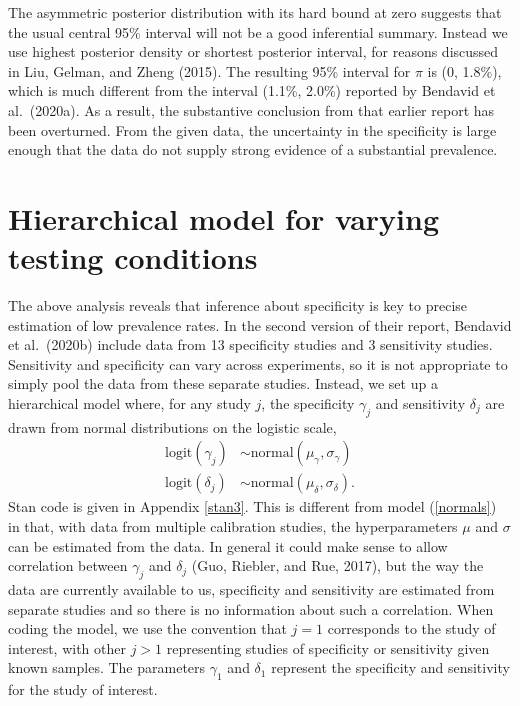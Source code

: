 \documentclass[11pt]{article}
\begin{document}
The asymmetric posterior distribution with its hard bound at zero suggests that the usual central 95\% interval will not be a good inferential summary.  Instead we use highest posterior density or shortest posterior interval, for reasons discussed in Liu, Gelman, and Zheng (2015). The resulting 95\% interval for $\pi$ is (0, 1.8\%), which is much different from the interval (1.1\%, 2.0\%) reported by Bendavid et al.\ (2020a).  As a result, the substantive conclusion from that earlier report has been overturned. From the given data, the uncertainty in the specificity is large enough that the data do not supply strong evidence of a substantial prevalence.

\section{Hierarchical model for varying testing conditions}\label{model2}
The above analysis reveals that inference about specificity is key to precise estimation of low prevalence rates.  In the second version of their report, Bendavid et al.\ (2020b) include data from 13 specificity studies and 3 sensitivity studies.  Sensitivity and specificity can vary across experiments, so it is not appropriate to simply pool the data from these separate studies.  Instead, we set up a hierarchical model where, for any study $j$, the specificity $\gamma_j$ and sensitivity $\delta_j$ are drawn from normal distributions on the logistic scale,
\begin{align*}
  \mbox{logit}(\gamma_j) & \sim \mbox{normal}(\mu_{\gamma}, \sigma_{\gamma})\\
 \mbox{logit}(\delta_j) & \sim \mbox{normal}(\mu_{\delta}, \sigma_{\delta}).
\end{align*}
Stan code is given in Appendix \ref{stan3}.
This is different from model (\ref{normals}) in that, with data from multiple calibration studies, the hyperparameters $\mu$ and $\sigma$ can be estimated from the data.  In general it could make sense to allow correlation between $\gamma_j$ and $\delta_j$ (Guo, Riebler, and Rue, 2017), but the way the data are currently available to us, specificity and sensitivity are estimated from separate studies and so there is no information about such a correlation.  When coding the model, we use the convention that $j=1$ corresponds to the study of interest, with other $j > 1$ representing studies of specificity or sensitivity given known samples.  The parameters $\gamma_1$ and $\delta_1$ represent the specificity and sensitivity for the study of interest.
\end{document}
